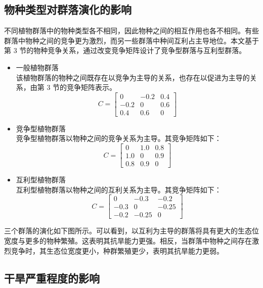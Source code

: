 \documentclass[11pt,a4paper]{ctexart}
\begin{document}
\subsection{物种类型对群落演化的影响}

不同植物群落中的物种类型各不相同，因此物种之间的相互作用也各不相同。有些群落中物种之间的竞争更为激烈，而另一些群落中种间互利占主导地位。本文基于第 3 节的物种竞争关系，通过改变竞争矩阵设计了竞争型群落与互利型群落。

\begin{itemize}
\item 一般植物群落\\
该植物群落的物种之间既存在以竞争为主导的关系，也存在以促进为主导的关系，由第 3 节的竞争矩阵表示。
\begin{equation}
C=\begin{bmatrix}
0 & -0.2 & 0.4\\
-0.2 & 0 & 0.6\\
0.4 & 0.6 & 0
\end{bmatrix}
\end{equation}
\item 竞争型植物群落\\
竞争型植物群落以物种之间的竞争关系为主导。其竞争矩阵如下：
\begin{equation}
C=\begin{bmatrix}
0 & 1.0 & 0.8\\
1.0 & 0 & 0.9\\
0.8 & 0.9 & 0
\end{bmatrix}
\end{equation}
\item 互利型植物群落\\
互利型植物群落以物种之间的互利关系为主导。其竞争矩阵如下：
\begin{equation}
C=\begin{bmatrix}
0 & -0.3 & -0.2\\
-0.3 & 0 & -0.25\\
-0.2 & -0.25 & 0
\end{bmatrix}
\end{equation}
\end{itemize}

三个群落的演化如下图所示。可以看到，以互利为主导的群落将具有更大的生态位宽度与更多的物种繁殖。这表明其抗旱能力更强。相反，当群落中物种之间存在激烈竞争时，其生态位宽度更小，种群繁殖更少，表明其抗旱能力更弱。

\subsection{干旱严重程度的影响}
\end{document}
